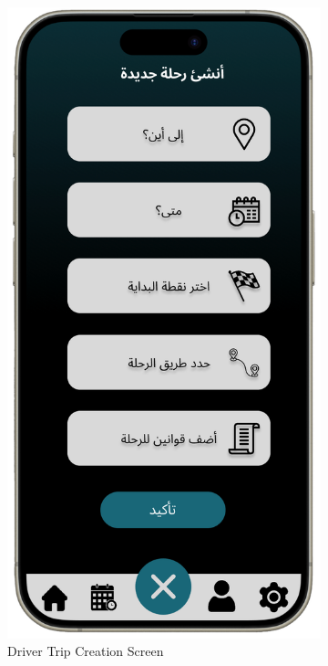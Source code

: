 \documentclass[a4paper, 12pt]{article} %
\begin{document}
\begin{figure}[h]
\begin{subfigure}{0.3\textwidth}
                    \includegraphics[width=0.8\linewidth, height=0.9\textheight, keepaspectratio]{Images/App_Desgin_Driver.png}  
                    \caption{Driver Trip Creation Screen}
                    \label{fig:our_driver}
                \end{subfigure}
                \begin{subfigure}{0.3\textwidth}

\end{subfigure}
\end{figure}
\end{document}
